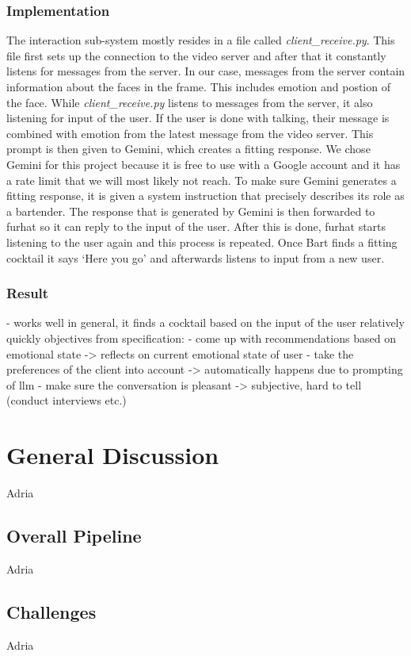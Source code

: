 \documentclass[conference]{IEEEtran}
\begin{document}
\subsubsection{Implementation}
The interaction sub-system mostly resides in a file called \textit{client\_receive.py}.
This file first sets up the connection to the video server and after that it constantly listens for messages from the server.
In our case, messages from the server contain information about the faces in the frame.
This includes emotion and postion of the face.
While \textit{client\_receive.py} listens to messages from the server, it also listening for input of the user.
If the user is done with talking, their message is combined with emotion from the latest message from the video server.
This prompt is then given to Gemini, which creates a fitting response.
We chose Gemini for this project because it is free to use with a Google account and it has a rate limit that we will most likely not reach.
To make sure Gemini generates a fitting response, it is given a system instruction that precisely describes its role as a bartender.
The response that is generated by Gemini is then forwarded to furhat so it can reply to the input of the user.
After this is done, furhat starts listening to the user again and this process is repeated.
Once Bart finds a fitting cocktail it says `Here you go' and afterwards listens to input from a new user.

\subsubsection{Result}
- works well in general, it finds a cocktail based on the input of the user relatively quickly
objectives from specification:
- come up with recommendations based on emotional state -> reflects on current emotional state of user
- take the preferences of the client into account -> automatically happens due to prompting of llm
- make sure the conversation is pleasant -> subjective, hard to tell (conduct interviews etc.)

\section{General Discussion}
Adria
\subsection{Overall Pipeline}
Adria
\subsection{Challenges}
Adria
\end{document}
